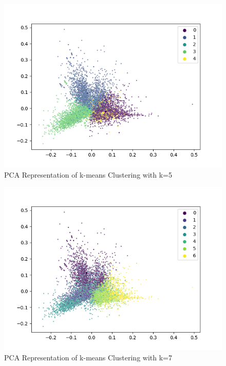 \documentclass[12pt,letterpaper,oneside,titlepage]{article}
\begin{document}
\begin{figure}[ht]
    \centering
    \includegraphics[scale=0.7]{kmeans-5}
    \captionsetup{justification=centering}
    \caption{PCA Representation of k-means Clustering with k=5}
\end{figure}
\FloatBarrier

\begin{figure}[ht]
    \centering
    \includegraphics[scale=0.7]{kmeans-7}
    \captionsetup{justification=centering}
    \caption{PCA Representation of k-means Clustering with k=7}
\end{figure}
\FloatBarrier
\end{document}
